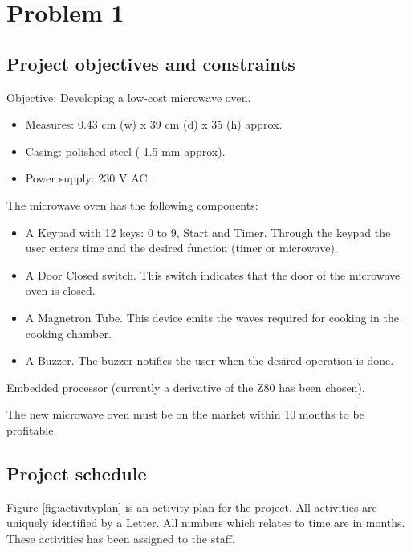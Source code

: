 \chapter{Problem 1}
\label{chp:intro}

\section{Project objectives and constraints}

Objective: Developing a low-cost microwave oven. 

\begin{itemize}
	\item Measures: 0.43 cm (w) x 39 cm (d) x 35 (h) approx.
	\item Casing: polished steel ( 1.5 mm approx).
	\item Power supply: 230 V AC.
\end{itemize}

The microwave oven has the following components:

\begin{itemize}
	\item A Keypad with 12 keys: 0 to 9, Start and Timer. Through the keypad the user enters
	time and the desired function (timer or microwave).

	\item A Door Closed switch. This switch indicates that the door of the microwave oven is
	closed.

	\item A Magnetron Tube. This device emits the waves required for cooking in the cooking
	chamber.
	
	\item A Buzzer. The buzzer notifies the user when the desired operation is done.
\end{itemize}

Embedded processor (currently a derivative of the Z80 has been chosen).

The new microwave oven must be on the market within 10 months to be profitable.

\section{Project schedule}
Figure \ref{fig:activityplan} is an activity plan for the project. All activities are uniquely identified by a Letter. All numbers which relates to time are in months. These activities has been assigned to the staff. 
